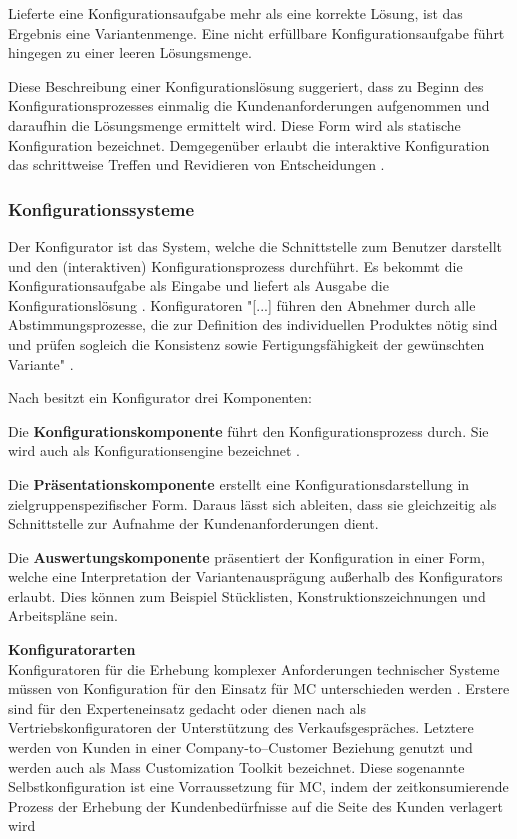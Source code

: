 \documentclass[12pt,a4paper,bibliography=totocnumbered,listof=totoc]{scrartcl}
\begin{document}
Lieferte eine Konfigurationsaufgabe mehr als eine korrekte Lösung, ist das Ergebnis eine Variantenmenge. Eine nicht erfüllbare Konfigurationsaufgabe führt hingegen zu einer leeren Lösungsmenge.

Diese Beschreibung einer Konfigurationslösung suggeriert, dass zu Beginn des Konfigurationsprozesses einmalig die Kundenanforderungen aufgenommen und daraufhin die Lösungsmenge ermittelt wird. Diese Form wird als statische Konfiguration bezeichnet. Demgegenüber erlaubt die interaktive Konfiguration das schrittweise Treffen und Revidieren von Entscheidungen \citep{hadzic04}.

\subsubsection{Konfigurationssysteme}
Der Konfigurator ist das System, welche die Schnittstelle zum Benutzer darstellt und den (interaktiven) Konfigurationsprozess durchführt. Es bekommt die Konfigurationsaufgabe als Eingabe und liefert als Ausgabe die Konfigurationslösung \citep{felferning14}. Konfiguratoren "[...] führen den Abnehmer durch alle Abstimmungsprozesse, die zur Definition des individuellen Produktes nötig sind und prüfen sogleich die Konsistenz sowie Fertigungsfähigkeit der gewünschten Variante" \citep{piller06}.

Nach \citet{piller06} besitzt ein Konfigurator drei Komponenten:
\begin{compactitem}
\item Die \textbf{Konfigurationskomponente} führt den Konfigurationsprozess durch. Sie wird auch als Konfigurationsengine bezeichnet \citep{tactonProductOverview}.
\item Die \textbf{Präsentationskomponente} erstellt eine Konfigurationsdarstellung in zielgruppenspezifischer Form. Daraus lässt sich ableiten, dass sie gleichzeitig als Schnittstelle zur Aufnahme der Kundenanforderungen dient.
\item Die \textbf{Auswertungskomponente} präsentiert der Konfiguration in einer Form, welche eine Interpretation der Variantenausprägung außerhalb des Konfigurators erlaubt. Dies können zum Beispiel Stücklisten, Konstruktionszeichnungen und Arbeitspläne sein.
\end{compactitem}

\textbf{Konfiguratorarten}\\
Konfiguratoren für die Erhebung komplexer Anforderungen technischer Systeme  müssen von Konfiguration für den Einsatz für \ac{MC} unterschieden werden \citep{felferning14}. Erstere sind für den Experteneinsatz gedacht oder dienen nach \citet{piller06} als Vertriebskonfiguratoren der Unterstützung des Verkaufsgespräches.   Letztere werden von Kunden in einer Company-to–Customer Beziehung genutzt und werden auch als Mass Customization Toolkit bezeichnet. Diese sogenannte Selbstkonfiguration ist eine Vorraussetzung für \ac{MC}, indem der zeitkonsumierende Prozess der Erhebung der Kundenbedürfnisse auf die Seite des Kunden verlagert wird \citep{piller06}
\end{document}

